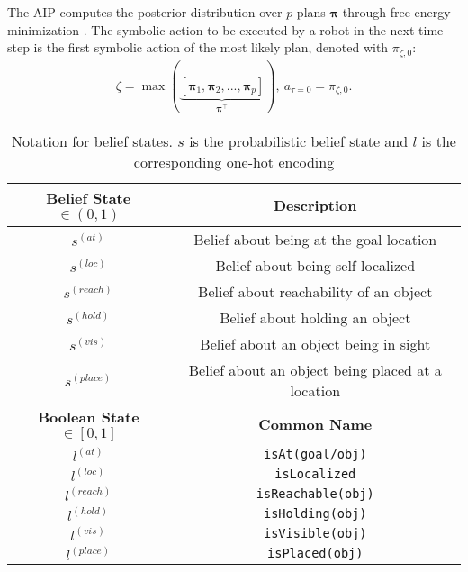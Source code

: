 The AIP computes the posterior distribution over $p$ plans
$\bm \pi$ through free-energy minimization
\cite{pezzato2023active}. The symbolic action to be executed
by a robot in the next time step is the first symbolic action of the
most likely plan, denoted with $\pi_{\zeta, 0}$:
\begin{eqnarray}
\label{eq:a_t}
    \zeta = \max(\underbrace{[\bm\pi_{1}, \bm\pi_{2},...,\bm\pi_{p}]}_{\bm \pi^\top}),\ 
    a_{\tau=0} = \pi_{\zeta, 0}.
\end{eqnarray}




\begin{table}[ht!]
\caption{Notation for belief states. $s$ is the probabilistic
  belief state and $l$ is the corresponding one-hot encoding}%
\centering %
  \begin{tabular}{c c}
  \toprule %
  \textbf{Belief State $\in (0,1)$} & \textbf{Description}\\ [0.5ex] %
  \midrule %
  $s^{(at)}$ & Belief about being at the goal location \\
  $s^{(loc)}$ & Belief about being self-localized \\
  $s^{(reach)}$ & Belief about reachability of an object\\
  $s^{(hold)}$ & Belief about holding an object\\
  $s^{(vis)}$ & Belief about an object being in sight\\
  $s^{(place)}$ & Belief about an object being placed at a location\\
  \midrule
  \textbf{Boolean State $\in [0, 1]$} & \textbf{Common Name}\\ [0.5ex] %
  \midrule %
  $l^{(at)}$ & \texttt{isAt(goal\slash obj)} \\
  $l^{(loc)}$ & \texttt{isLocalized} \\
  $l^{(reach)}$ & \texttt{isReachable(obj)}\\
  $l^{(hold)}$ & \texttt{isHolding(obj)}\\
  $l^{(vis)}$ & \texttt{isVisible(obj)}\\
  $l^{(place)}$ & \texttt{isPlaced(obj)}\\
  \bottomrule %
  \end{tabular}
  \label{tab:States}
\end{table}

